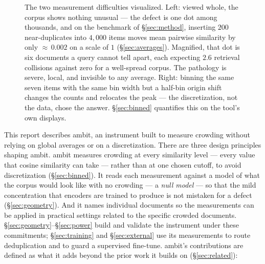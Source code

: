 \documentclass[11pt,letterpaper]{article}
\begin{document}
\begin{figure}[t]
\begin{minipage}{0.48\textwidth}
\centering
{}
\end{minipage}
\caption{The two measurement difficulties visualized. Left:
viewed whole, the corpus shows nothing unusual --- the defect is one dot
among thousands, and on the benchmark of \S\ref{sec:method}, inserting
$200$ near-duplicates into $4{,}000$ items moves mean pairwise similarity
by only ${\approx}\,0.002$ on a scale of $1$ (\S\ref{sec:averages}).
Magnified, that dot is six documents a
query cannot tell apart, each expecting $2.6$ retrieval collisions against
zero for a well-spread corpus. The pathology is severe, local, and
invisible to any average.
Right:
binning the same seven items with the same bin width but a half-bin origin
shift changes the counts and relocates the peak --- the discretization, not
the data, chose the answer. \S\ref{sec:binned} quantifies this on the
tool's own displays.}
\label{fig:introwhy}
\end{figure} This report describes \textsf{ambit}, an
instrument built to measure crowding without relying on global
averages or on a discretization. There are three design principles
shaping \textsf{ambit}. \textsf{ambit} measures crowding at every similarity level --- every
value that cosine similarity can take --- rather than at one chosen
cutoff, to avoid discretization
(\S\ref{sec:binned}). It reads each measurement against a model of what
the corpus would look like with no crowding --- a \emph{null model} --- so
that the mild concentration that encoders are trained to produce is not
mistaken for a defect (\S\ref{sec:geometry}). And it names individual
documents so the measurements can be applied in practical settings related
to the specific crowded documents. \S\ref{sec:geometry}--\S\ref{sec:power}
build and validate the instrument under these commitments;
\S\ref{sec:training} and \S\ref{sec:external} use its measurements to
route deduplication and to guard a supervised fine-tune. \textsf{ambit}'s
contributions are defined as what it adds beyond the prior work it builds
on (\S\ref{sec:related}):
\end{document}
